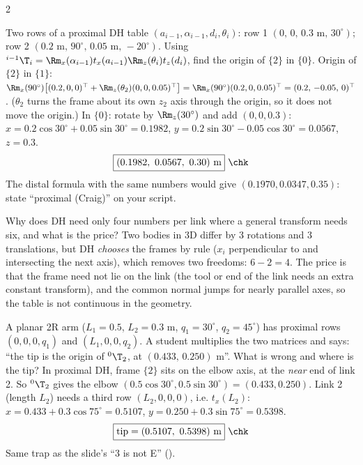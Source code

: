 \begin{multicols*}{2}
\begin{examq}
Two rows of a proximal DH table $(a_{i-1},\alpha_{i-1},d_i,\theta_i)$: row 1 $(0,\,0,\,0.3\text{ m},\,30^\circ)$; row 2 $(0.2\text{ m},\,90^\circ,\,0.05\text{ m},\,-20^\circ)$. Using ${}^{i-1}\T_i=\Rm_x(\alpha_{i-1})t_x(a_{i-1})\Rm_z(\theta_i)t_z(d_i)$, find the origin of $\{2\}$ in $\{0\}$.
\solution
Origin of $\{2\}$ in $\{1\}$: $\Rm_x(90^\circ)\big[(0.2,0,0)^\top+\Rm_z(\theta_2)(0,0,0.05)^\top\big]=\Rm_x(90^\circ)(0.2,0,0.05)^\top=(0.2,\,-0.05,\,0)^\top$. ($\theta_2$ turns the frame about its own $z_2$ axis through the origin, so it does not move the origin.) In $\{0\}$: rotate by $\Rm_z(30^\circ)$ and add $(0,0,0.3)$: $x=0.2\cos30^\circ+0.05\sin30^\circ=0.1982$, $y=0.2\sin30^\circ-0.05\cos30^\circ=0.0567$, $z=0.3$.
\[\boxed{(0.1982,\ 0.0567,\ 0.30)\ \text{m}}\ \chk\]
The distal formula with the same numbers would give $(0.1970,0.0347,0.35)$: state ``proximal (Craig)'' on your script.
\end{examq}


\begin{examq}
Why does DH need only four numbers per link where a general transform needs six, and what is the price?
\solution
Two bodies in 3D differ by 3 rotations and 3 translations, but DH \emph{chooses} the frames by rule ($x_i$ perpendicular to and intersecting the next axis), which removes two freedoms: $6-2=4$. The price is that the frame need not lie on the link (the tool or end of the link needs an extra constant transform), and the common normal jumps for nearly parallel axes, so the table is not continuous in the geometry. 
\end{examq}

\begin{examq}
A planar 2R arm ($L_1=0.5$, $L_2=0.3$ m, $q_1=30^\circ$, $q_2=45^\circ$) has proximal rows $(0,0,0,q_1)$ and $(L_1,0,0,q_2)$. A student multiplies the two matrices and says: ``the tip is the origin of ${}^0\T_2$, at $(0.433,\,0.250)$ m''. What is wrong and where is the tip?
\solution
In proximal DH, frame $\{2\}$ sits on the elbow axis, at the \emph{near} end of link 2. So ${}^0\T_2$ gives the elbow $(0.5\cos30^\circ,0.5\sin30^\circ)=(0.433,0.250)$. Link 2 (length $L_2$) needs a third row $(L_2,0,0,0)$, i.e. $t_x(L_2)$: $x=0.433+0.3\cos75^\circ=0.5107$, $y=0.250+0.3\sin75^\circ=0.5398$.
\[\boxed{\text{tip}=(0.5107,\ 0.5398)\ \text{m}}\ \chk\]
Same trap as the slide's ``{3} is not {E}'' ().
\end{examq}
\end{multicols*}
